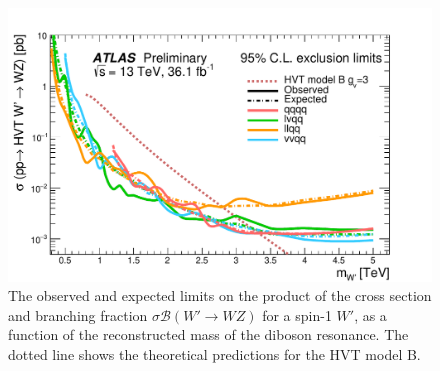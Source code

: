 \begin{figure}[!htb]
  \centering
    \includegraphics[width=.495\textwidth]{figures/ATLAS_Diboson_Summary.pdf}
  \caption{The observed and expected limits on the product of the cross section and branching fraction $\sigma \mathcal{B} (W' \rightarrow WZ)$ for a spin-1 $W'$, as a function of the reconstructed mass of the diboson resonance. The dotted line shows the theoretical predictions for the HVT model B.}
  \label{fig:theory_ATLAS_Diboson_Summary}
\end{figure}

